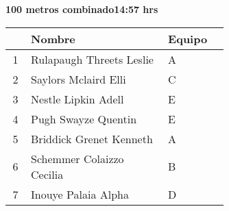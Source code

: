 \begin{minipage}{0.95\linewidth}
\begin{center}
\textbf{
100 metros combinado\hspace{1cm}14:57 hrs}
\end{center}
\begin{tabular}{cp{0.63\linewidth}l}
\hline
& \textbf{Nombre} & \textbf{Equipo} \\ \hline
1 & Rulapaugh Threets Leslie & A \\ 
2 & Saylors Mclaird Elli & C \\ 
3 & Nestle Lipkin Adell & E \\ 
4 & Pugh Swayze Quentin & E \\ 
5 & Briddick Grenet Kenneth & A \\ 
6 & Schemmer Colaizzo Cecilia & B \\ 
7 & Inouye Palaia Alpha & D \\ 
\end{tabular}
\end{minipage}

